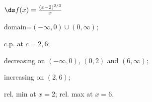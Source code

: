 {$\ds f(x) =\frac{(x-2)^{2/3}}{x}$
}
{domain=$(-\infty,0)\cup(0,\infty)$;

c.p. at $c=2,6$; 

decreasing on $(-\infty,0)$, $(0,2)$ and $(6,\infty)$;

increasing on $(2,6)$;

rel. min at $x=2$;
rel. max at $x=6$.
}
